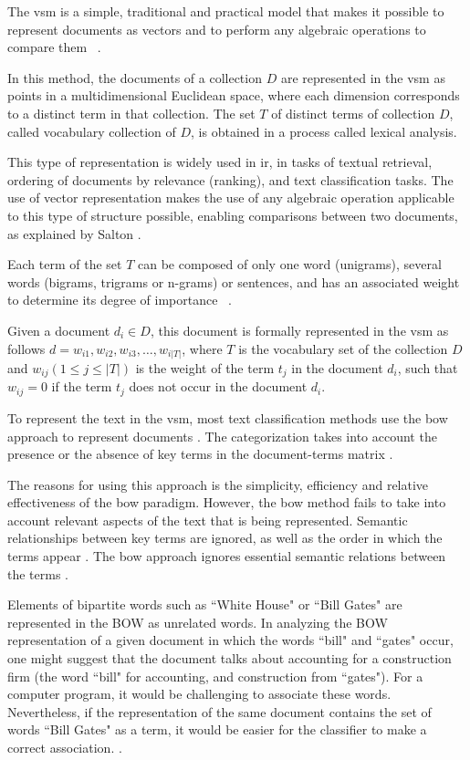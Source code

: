 The \gls{vsm} is a simple, traditional and practical model that makes it possible to represent documents as vectors and to perform any algebraic operations to compare them ~\cite{salton1988term}.

In this method, the documents of a collection $D$ are represented in the \gls{vsm} as points in a multidimensional Euclidean space, where each dimension corresponds to a distinct term in that collection. The set $T$ of distinct terms of collection $D$, called vocabulary collection of $D$, is obtained in a process called lexical analysis.


This type of representation is widely used in \gls{ir}, in tasks of textual retrieval, ordering of documents by relevance (ranking), and text classification tasks. The use of vector representation makes the use of any algebraic operation applicable to this type of structure possible, enabling comparisons 
between two 
documents, as explained by Salton \cite{Salton:1975}.

Each term of the set $T$ can be composed of only one word (unigrams), several words (bigrams, trigrams or n-grams) or sentences, and has an associated weight to determine its degree of importance ~\cite{salton1988term}.

Given a document $d_i \in D$, this document is formally represented in the \gls{vsm} as follows $d={w_{i1},w_{i2},w_{i3},\ldots,w_{i|T|}}$, where $T$ is the vocabulary set of the collection $D$ and $w_{ij} (1 \le j \le |T|)$ is the weight of the term $t_j$ in the document $d_i$, such that $w_{ij} = 0$ if the term $t_j$ does not occur in the document $d_i$.

To represent the text in the \gls{vsm}, most text classification methods use the \gls{bow} approach to represent documents \cite{Lan:2009} \cite{Manning:2008}. The categorization takes into account the presence or the absence of key terms in the document-terms matrix %
\cite{Sebastiani:2002}.

The reasons for using this approach is the simplicity, efficiency and relative effectiveness of the \gls{bow} paradigm. However, the \gls{bow} method fails to take into account relevant aspects of the text that is being represented. Semantic relationships between key terms are ignored, as well as the order in which the terms appear \cite{Gabrilovich:2005, Lan:2009}. The \gls{bow} approach ignores essential semantic relations between the terms \cite {Hu:2008}.

Elements of bipartite words such as ``White House" or ``Bill Gates" are represented in the BOW as unrelated words. In analyzing the BOW representation of a given document in which the words ``bill" and ``gates" occur, one might suggest that the document talks about accounting for a construction firm (the word ``bill" for accounting, and construction from ``gates"). For a computer program, it would be challenging to associate these words.
Nevertheless, if the representation of the same document contains the set of words ``Bill Gates" as a term, it would be easier for the classifier to make a correct association. \cite{bekkerman2004using}.



